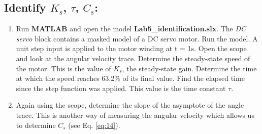 \documentclass[11pt,a4paper]{article}
\begin{document}
\subsection{Identify $K_{s}$, $\tau$, $C_{s}$:}
\begin{enumerate}
\item Run \textbf{MATLAB} and open the model \textbf{Lab5\_identification.slx}. The \textit{DC servo} block contains a masked model of a DC servo motor. Run the model. A unit step input is applied to the motor winding at t = 1s. Open the scope and look at the angular velocity trace. Determine the steady-state speed of the motor. This is the value of $K_{s}$, the steady-state gain. Determine the time at which the speed reaches 63.2\% of its final value. Find the elapsed time since the step function was applied. This value is the time constant $\tau$.

\item Again using the scope, determine the slope of the asymptote of the angle trace. This is another way of measuring the angular velocity which allows us to determine $C_{s}$ (see Eq. \ref{eq:14}). 
\end{enumerate}
\end{document}
